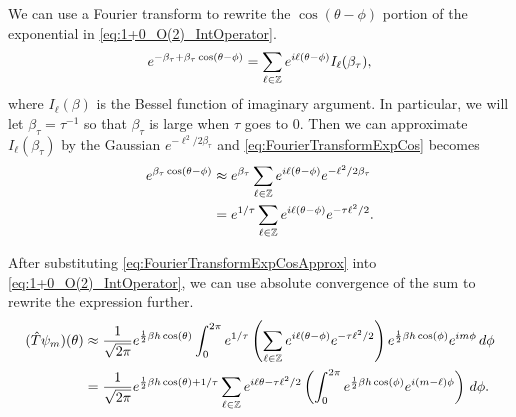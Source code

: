 \documentclass[11pt,reqno]{amsart}
\begin{document}
	We can use a Fourier transform to rewrite the $\cos(\theta-\phi)$ portion of the exponential in \cref{eq:1+0_O(2)_IntOperator}.
	\begin{equation}\label{eq:FourierTransformExpCos}
		e^{-\beta_\tau+\beta_\tau\cos(\theta-\phi)}=\sum_{\ell\in \mathbb{Z}}e^{i\ell(\theta-\phi)}I_\ell(\beta_\tau),
	\end{equation}
	where $I_\ell(\beta)$ is the Bessel function of imaginary argument.
	In particular, we will let $\beta_\tau=\tau^{-1}$ so that $\beta_\tau$ is large when $\tau$ goes to 0. 
	Then we can approximate $I_\ell(\beta_\tau)$ by the Gaussian $e^{-\ell^2/2\beta_\tau}$ and \cref{eq:FourierTransformExpCos} becomes
	\begin{align}
		e^{\beta_\tau\cos(\theta-\phi)}&\approx e^{\beta_\tau}\sum_{\ell\in \mathbb{Z}}e^{i\ell(\theta-\phi)}e^{-\ell^2/2\beta_\tau}\\
			&=e^{1/\tau}\sum_{\ell\in \mathbb{Z}}e^{i\ell(\theta-\phi)}e^{-\tau\ell^2/2}. \label{eq:FourierTransformExpCosApprox}
	\end{align}
	
	After substituting \cref{eq:FourierTransformExpCosApprox} into \cref{eq:1+0_O(2)_IntOperator}, we can use absolute convergence of the sum to rewrite the expression further.
	\begin{align}
		(\hat{T}\psi_m)(\theta) &\approx \frac{1}{\sqrt{2\pi}}e^{\frac{1}{2}\beta h \cos(\theta)} \int_{0}^{2\pi} e^{1/\tau} \left( \sum_{\ell\in \mathbb{Z}}e^{i\ell(\theta-\phi)}e^{-\tau\ell^2/2} \right) e^{\frac{1}{2}\beta h \cos(\phi)}e^{im\phi}\, d\phi \nonumber \\
			&= \frac{1}{\sqrt{2\pi}}e^{\frac{1}{2}\beta h \cos(\theta)+1/\tau} \sum_{\ell\in \mathbb{Z}} e^{i\ell\theta-\tau\ell^2/2}\left(\int_{0}^{2\pi} e^{\frac{1}{2}\beta h \cos(\phi)}e^{i(m-\ell)\phi}\right) \, d\phi. \label{eq:1+0_O(2)_ApproxIntOperator}
	\end{align}
	
\end{document}
